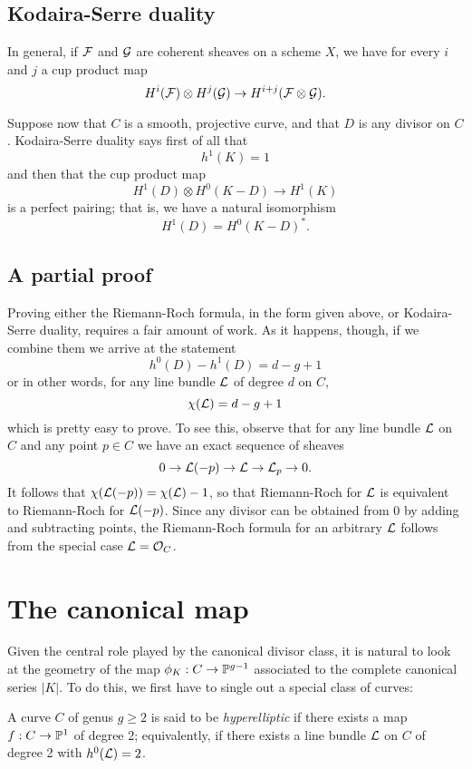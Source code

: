 \subsection{Kodaira-Serre duality}

In general, if $\cF$ and $\cG$ are coherent sheaves on a scheme $X$, we have for every $i$ and $j$ a cup product map
$$
H^i(\cF) \otimes H^j(\cG) \to H^{i+j}(\cF \otimes \cG).
$$

Suppose now that $C$ is a smooth, projective curve, and that $D$ is any divisor on $C$. Kodaira-Serre duality says first of all that
$$
h^1(K) = 1
$$
and then that the cup product map
$$
H^1(D) \otimes H^0(K-D) \to H^1(K)
$$
is a perfect pairing; that is, we have a natural isomorphism
$$
H^1(D) = H^0(K-D)^*.
$$

\subsection{A partial proof}

Proving either the Riemann-Roch formula, in the form given above, or Kodaira-Serre duality, requires a fair amount of work. As it happens, though, if we combine them we arrive at the statement
$$
h^0(D) - h^1(D) = d-g+1
$$
or in other words, for any line bundle $\cL$ of degree $d$ on $C$,
$$
\chi(\cL) = d-g+1
$$
which is pretty easy to prove. To see this, observe that for any line bundle $\cL$ on $C$ and any point $p \in C$ we have an exact sequence of sheaves
$$
0 \to \cL(-p) \to \cL \to \cL_p \to 0.
$$
It follows that $\chi(\cL(-p)) = \chi(\cL) - 1$, so that Riemann-Roch for $\cL$ is equivalent to Riemann-Roch for $\cL(-p)$. Since any divisor can be obtained from 0 by adding and subtracting points, the Riemann-Roch formula for an arbitrary $\cL$ follows from the special case $\cL = \cO_C$.

\section{The canonical map}

Given the central role played by the canonical divisor class, it is natural to look at the geometry of the map $\phi_K : C \to \PP^{g-1}$ associated to the complete canonical series $|K|$. To do this, we first have to single out a special class of curves:

\begin{definition}
A curve $C$ of genus $g \geq 2$ is said to be \emph{hyperelliptic} if there exists a map $f : C \to \PP^1$ of degree 2; equivalently, if there exists a line bundle $\cL$ on $C$ of degree 2 with $h^0(\cL) = 2$.
\end{definition}

